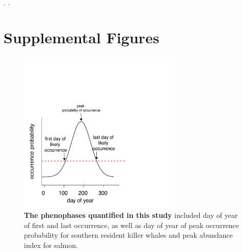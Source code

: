 \documentclass{article}
\begin{document}
\newpage
.
.

\newpage
\section* {Supplemental Figures}

\begin{figure}[!hp]
\includegraphics[width=0.7\textwidth]{../analyses/figures/phenophases.pdf}
\caption{\textbf{The phenophases quantified in this study} included day of year of first and last occurrence, as well as day of year of peak occurrence probability for southern resident killer whales and peak abundance index for salmon.}
\label{fig:ctcalb}
\end{figure}

\vspace*{\floatsep}
\end{document}
